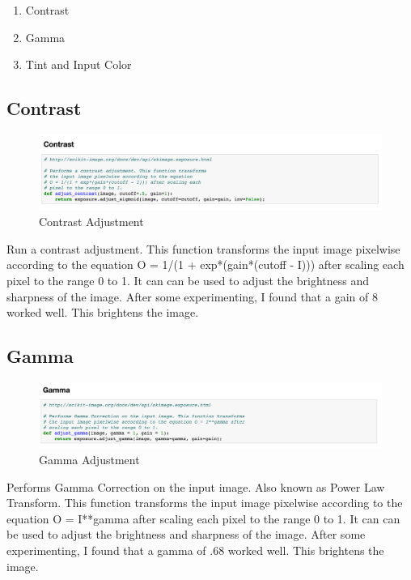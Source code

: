 \documentclass{article}
\begin{document}
\begin{enumerate}
\item Contrast
\item Gamma
\item Tint and Input Color
\end{enumerate}

\subsection{Contrast}

\begin{figure}[H]
\includegraphics[width=\linewidth]{contrast.png} \caption{Contrast Adjustment}
\label{fig:contrastAdjustment}
\end{figure}

Run a contrast adjustment. This function transforms the input image pixelwise according to the equation O = 1/(1 + exp*(gain*(cutoff - I))) after scaling each pixel to the range 0 to 1. \cite{website:exposure} It can can be used to adjust the brightness and sharpness of the image. After some experimenting, I found that a gain of 8 worked well. This brightens the image.

\subsection{Gamma}

\begin{figure}[H]
\includegraphics[width=\linewidth]{gamma.png} \caption{Gamma Adjustment}
\label{fig:gammaAdjustment}
\end{figure}

Performs Gamma Correction on the input image. Also known as Power Law Transform. This function transforms the input image pixelwise according to the equation O = I**gamma after scaling each pixel to the range 0 to 1. \cite{website:exposure} It can can be used to adjust the brightness and sharpness of the image. After some experimenting, I found that a gamma of .68 worked well. This brightens the image.
\end{document}
